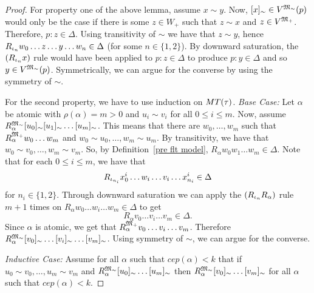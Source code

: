 \begin{proof}
    
    \par For property one of the above lemma, assume $x\sim y$. Now, $[x]_\sim\in V^{{\mathfrak{M}_\sim}}(p)$ would only be the case if there is some $z\in W_+$ such that $z\sim x$ and $z\in V^{\mathfrak{M}_+}$. Therefore, $p:z\in\Delta$. 
    Using transitivity of $\sim$ we have that $z\sim y$, hence $R_{\iota_{n}}w_0\ldots z \ldots y \ldots w_n\in\Delta$ (for some $n\in\{1,2\}$). By downward saturation, the $(R_{\iota_{n}}x)$ rule would have been applied to $p:z\in\Delta$ to produce $p:y\in\Delta$ and so $y\in V^{\mathfrak{M}_\sim}(p)$. Symmetrically, we can argue for the converse by using the symmetry of $\sim$.
    \par For the second property, we have to use induction on $MT(\tau)$. \textit{Base Case:} Let $\alpha$ be atomic with $\rho(\alpha)=m>0$ and $u_i\sim v_i$ for all $0\leq i \leq m$.  Now, assume $R^{\mathfrak{M}_\sim}_\alpha [u_0]_\sim[u_1]_\sim\ldots [u_m]_\sim$. This means that there are $w_0,\ldots,w_m$ such that $R^{\mathfrak{M}_+}_\alpha w_0\ldots w_m$ and $w_0\sim u_0, \ldots, w_m\sim u_m$. By transitivity, we have that $w_0\sim v_0, \ldots, w_m\sim v_m$. So, by Definition~\ref{pre flt model}, $R_\alpha w_0w_1\ldots w_m\in \Delta$. Note that for each $0\leq i \leq m$, we have that $$R_{\iota_{n_i}}x_0^i \ldots w_i \ldots v_i \ldots x_{n_i}^i\in \Delta$$  for $n_i\in\{1,2\}$. Through downward saturation we can apply the $(R_{\iota_n} R_\alpha)$ rule $m+1$ times on $R_\alpha w_0\ldots w_i \ldots w_m\in \Delta$ to get $$R_\alpha v_0\ldots v_i \ldots v_m\in\Delta.$$ Since $\alpha$ is atomic, we get that $R^{\mathfrak{M}_+}_\alpha v_0\ldots v_i \ldots v_m$. Therefore $R^{\mathfrak{M}_\sim}_\alpha [v_0]_\sim\ldots [v_i]_\sim \ldots [v_m]_\sim$. Using symmetry of $\sim$, we can argue for the converse.
    \par \textit{Inductive Case:} Assume for all $\alpha$ such that $cep(\alpha)<k$ that if $u_0\sim v_0, \ldots, u_m\sim v_m$ and $R^{\mathfrak{M}_\sim}_\alpha [u_0]_\sim\ldots [u_m]_\sim$ then $R^{\mathfrak{M}_\sim}_\alpha [v_0]_\sim\ldots [v_m]_\sim$ for all $\alpha$ such that $cep(\alpha)<k$.

\end{proof}
